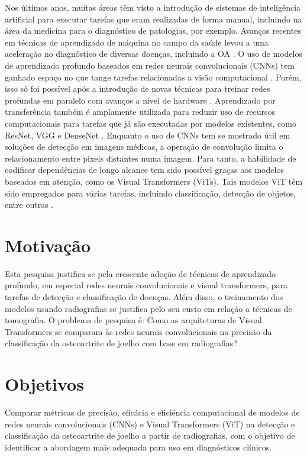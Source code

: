 Nos últimos anos, muitas áreas têm visto a introdução de sistemas de inteligência artificial para executar tarefas que eram realizadas de forma manual, incluindo na área da medicina para o diagnóstico de patologias, por exemplo. Avanços recentes em técnicas de aprendizado de máquina no campo da saúde levou a uma aceleração no diagnóstico de diversas doenças, incluindo a OA \cite{Mohammed2023}. O uso de modelos de aprendizado profundo baseados em redes neurais convolucionais (CNNs) tem ganhado espaço no que tange tarefas relacionadas a visão computacional \cite{Tariq2023}. Porém, isso só foi possível após a introdução de novas técnicas para treinar redes profundas em paralelo com avanços a nível de hardware \cite{Litjens2017}. Aprendizado por transferência também é amplamente utilizada para reduzir uso de recursos computacionais para tarefas que já são executadas por modelos existentes, como ResNet, VGG e DenseNet \cite{Tariq2023}. Enquanto o uso de CNNs tem se mostrado útil em soluções de detecção em imagens médicas, a operação de convolução limita o relacionamento entre pixels distantes numa imagem. Para tanto, a habilidade de codificar dependências de longo alcance tem sido possível graças aos modelos baseados em atenção, como os Visual Transformers (ViTs). Tais modelos ViT têm sido empregados para várias tarefas, incluindo classificação, detecção de objetos, entre outras \cite{Shamshad2023}.

\section*{Motivação}\label{sec:motivacao}

Esta pesquisa justifica-se pela crescente adoção de técnicas de aprendizado profundo, em especial redes neurais convolucionais e visual transformers, para tarefas de detecção e classificação de doenças. Além disso, o treinamento dos modelos usando radiografias se justifica pelo seu custo em relação a técnicas de tomografia. O problema de pesquisa é: Como as arquiteturas de Visual Transformers se comparam às redes neurais convolucionais na precisão da classificação da osteoartrite de joelho com base em radiografias?

\section*{Objetivos}\label{sec:objetivos}

Comparar métricas de precisão, eficácia e eficiência computacional de modelos de redes neurais convolucionais (CNNs) e Visual Transformers (ViT) na detecção e classificação da osteoartrite de joelho a partir de radiografias, com o objetivo de identificar a abordagem mais adequada para uso em diagnósticos clínicos.

